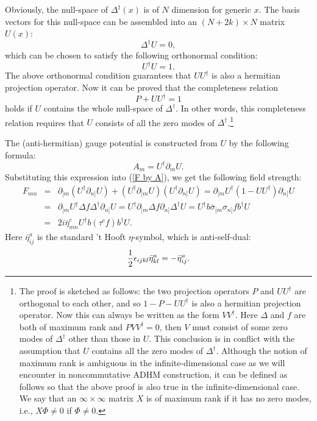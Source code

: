 \documentclass[a4paper,a4paper]{article}
\begin{document}
Obviously, the null-space of $\Delta^\dagger(x)$ is of $N$
dimension for generic $x$. The basis vectors for this null-space
can be assembled into an $(N+2k)\times N$ matrix $U(x)$:
\begin{equation}
\Delta^\dag U=0,
\end{equation}
which can be chosen to satisfy the following orthonormal
condition:
\begin{equation}
\label{normal} U^\dag U=1.
\end{equation}
The above orthonormal condition guarantees that $UU^\dag$ is also
a hermitian projection operator. Now it can be proved that the
completeness relation \cite{Paperb}
\begin{equation}
\label{complete} P+UU^\dag=1
\end{equation}
holds if $U$ contains the whole null-space of $\Delta^\dagger$. In
other words, this completeness relation requires that $U$ consists
of all the zero modes of $\Delta^\dagger$.\footnote{The proof is
sketched as follows: the two projection operators $P$ and
$UU^\dag$ are orthogonal to each other, and so $1-P-UU^\dag$ is
also a hermitian projection operator. Now this can always be
written as the form $VV^\dag$. Here $\Delta$ and $f$ are both of
maximum rank and $PVV^\dag=0$, then $V$ must consist of some zero
modes of $\Delta^\dagger$ other than those in $U$. This conclusion
is in conflict with the assumption that $U$ contains all the zero
modes of $\Delta^\dagger$. Although the notion of maximum rank is
ambiguous in the infinite-dimensional case as we will encounter in
noncommutative ADHM construction, it can be defined as follows so
that the above proof is also true in the infinite-dimensional
case. We say that an $\infty\times\infty$ matrix $X$ is of maximum
rank if it has no zero modes, i.e., $X\Phi\ne 0$ if $\Phi\ne 0$.}

The (anti-hermitian) gauge potential is constructed from $U$ by
the following formula:
\begin{equation}
A_m= U^\dag\partial_m U.
\end{equation}
Substituting this expression into (\ref{F by A}), we get the
following field strength:
\begin{eqnarray}
\label{calculate F} F_{mn}&=&\partial_{[m}(U^\dag\partial_{n]}U)
+(U^\dag\partial_{[m}U)(U^\dag\partial_{n]}U)
=\partial_{[m}U^\dag(1-UU^\dag)\partial_{n]}U\nonumber\\
&=&\partial_{[m}U^\dag\Delta f\Delta^\dag\partial_{n]}U
=U^\dag\partial_{[m}\Delta f\partial_{n]}\Delta^\dag U
=U^\dag b\bar\sigma_{[m}\sigma_{n]}f b^\dag U\nonumber\\
&=& 2i\bar\eta^c_{mn}U^\dag b(\tau^c f)b^\dag U.
\end{eqnarray}
Here $\bar\eta^a_{ij}$ is the standard 't Hooft $\eta$-symbol,
which is anti-self-dual:
\begin{equation}
\frac{1}{2}\epsilon_{ijkl}\bar\eta^a_{kl}=-\bar\eta^a_{ij}.
\end{equation}
\end{document}
